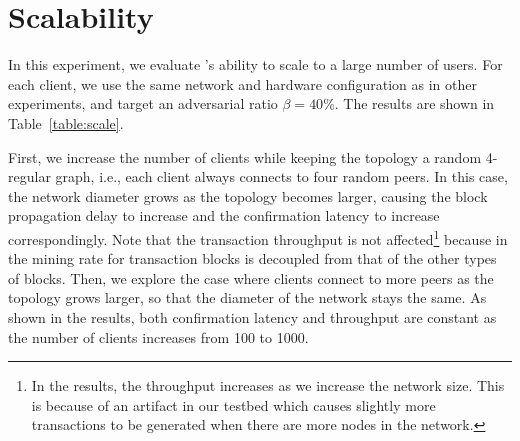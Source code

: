 
\section{Scalability}

\label{sec:eval-scale}
\vspace{-1mm}
\begin{table}[ht]
	\centering
	\caption{\small Performance of \prism with different network topologies.}
	\vspace{-2mm}
	\label{table:scale}
	\vspace{-2mm}
	\end{table}

In this experiment, we evaluate \prism's ability to scale to a large number of users. For each client, we use the same network and hardware configuration as in other experiments, and target an adversarial ratio $\beta=40\%$. The results are shown in Table~\ref{table:scale}.

First, we increase the number of clients while keeping the topology a random 4-regular graph, i.e., each client always connects to four random peers. In this case, the network diameter grows as the topology becomes larger, causing the block propagation delay to increase and the confirmation latency to increase correspondingly. Note that the transaction throughput is not affected\footnote{In the results, the throughput increases as we increase the network size. This is because of an artifact in our testbed which causes slightly more transactions to be generated when there are more nodes in the network.} because in \prism the mining rate for transaction blocks is decoupled from that of the other types of blocks. Then, we explore the case where clients connect to more peers as the topology grows larger, so that the diameter of the network stays the same. As shown in the results, both confirmation latency and throughput are constant as the number of clients increases from 100 to 1000. 

